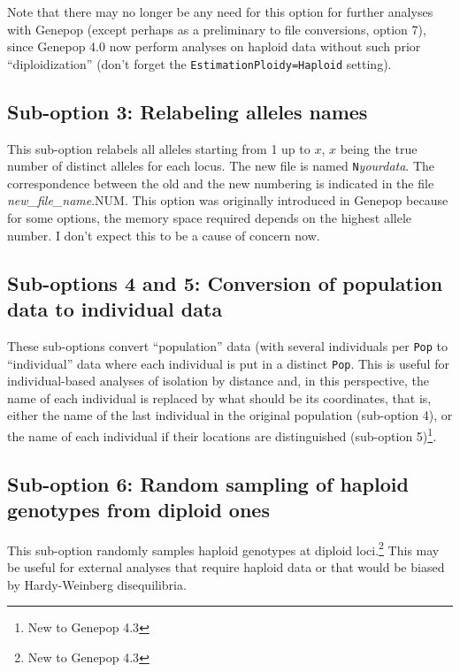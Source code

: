 \documentclass[12pt,]{book}
\let\rmarkdownfootnote\footnote%
\def\footnote{\protect\rmarkdownfootnote}
\begin{document}
Note that there may no longer be any need for this option for further
analyses with Genepop (except perhaps as a preliminary to file
conversions, option 7), since Genepop 4.0 now perform analyses on
haploid data without such prior ``diploidization'' (don't forget the
\texttt{EstimationPloidy=Haploid} setting).

\subsection{Sub-option 3: Relabeling alleles
names}\label{sub-option-3-relabeling-alleles-names}

 This sub-option relabels all alleles starting
from 1 up to \(x\), \(x\) being the true number of distinct alleles for
each locus. The new file is named \texttt{N}\emph{yourdata}. The
correspondence between the old and the new numbering is indicated in the
file \emph{new\_file\_name}.NUM. This option was originally introduced
in Genepop because for some options, the memory space required depends
on the highest allele number. I don't expect this to be a cause of
concern now.

\subsection{Sub-options 4 and 5: Conversion of population data to
individual
data}\label{sub-options-4-and-5-conversion-of-population-data-to-individual-data}

 These
sub-options convert ``population'' data (with several individuals per
\texttt{Pop} to ``individual'' data where each individual is put in a
distinct \texttt{Pop}. This is useful for individual-based analyses of
isolation by distance and, in this perspective, the name of each
individual is replaced by what should be its coordinates, that is,
either the name of the last individual in the original population
(sub-option 4), or the name of each individual if their locations are
distinguished (sub-option 5)\footnote{New to Genepop 4.3}.

\subsection{Sub-option 6: Random sampling of haploid genotypes from
diploid
ones}\label{sub-option-6-random-sampling-of-haploid-genotypes-from-diploid-ones}

This sub-option randomly samples haploid genotypes at diploid
loci.\footnote{New to Genepop 4.3} This may be useful for external
analyses that require haploid data or that would be biased by
Hardy-Weinberg disequilibria.
\end{document}
